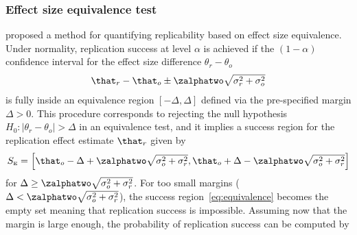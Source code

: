\subsubsection{Effect size equivalence test}
\citet{Anderson2016} proposed a method for quantifying replicability based on
effect size equivalence. Under normality, replication success at level $\alpha$
is achieved if the $(1 - \alpha)$ confidence interval for the effect size
difference $\theta_{r} - \theta_{o}$
\begin{align*}
  \that_{r} - \that_{o} \pm \zalphatwo \sqrt{\sigma^{2}_{r} + \sigma^{2}_{o}}
\end{align*}
is fully inside an equivalence region $[-\Delta, \Delta]$ defined via the
pre-specified margin $\Delta > 0$. This procedure corresponds to rejecting the
null hypothesis $H_{0} \colon |\theta_{r} - \theta_{o}| > \Delta$ in an
equivalence test, and it implies a success region for the replication effect
estimate $\that_{r}$ given by
\begin{align}
  \label{eq:equivalence}
  S_{\scriptscriptstyle \text{E}}
  = \left[\that_{o} - \Delta + \zalphatwo \sqrt{\sigma^{2}_{o} +
  \sigma^{2}_{r}}, \that_{o} + \Delta - \zalphatwo
  \sqrt{\sigma^{2}_{o} + \sigma^{2}_{r}}\right]
\end{align}
for $\Delta \geq \zalphatwo \sqrt{\sigma_{o}^{2} + \sigma^{2}_{r}}$. For too
small margins ($\Delta < \zalphatwo \sqrt{\sigma_{o}^{2} + \sigma^{2}_{r}}$),
the success region~\eqref{eq:equivalence} becomes the empty set meaning that
replication success is impossible.
Assuming now that the margin is large enough,
the probability
of replication success can be computed by
